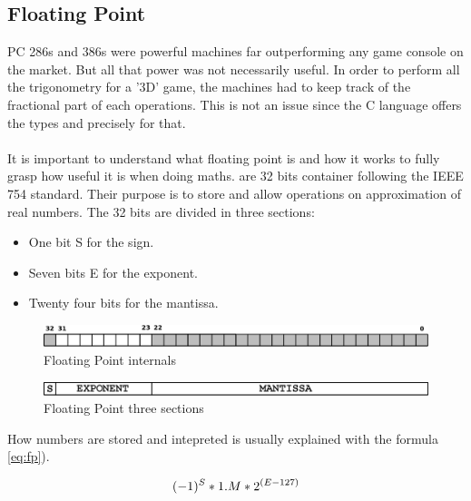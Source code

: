 \documentclass[book.tex]{subfiles}
\begin{document}
  \subsection{Floating Point}
  
   PC 286s and 386s were powerful machines far outperforming any game console on the market. But all that power was not necessarily useful. In order to perform all the trigonometry for a '3D' game, the machines had to keep track of the fractional part of each operations. This is not an issue since the C language offers the types  and  precisely for that.\\
\\
It is important to understand what floating point is and how it works to fully grasp how useful it is when doing maths.  are 32 bits container following the IEEE 754 standard. Their purpose is to store and allow operations on approximation of real numbers. The 32 bits are divided in three sections:\\
\begin{itemize}
  \item One bit S for the sign.
  \item Seven bits E for the exponent.
  \item Twenty four bits for the mantissa.
\end{itemize} 

\begin{figure}[H]
\centering
\includegraphics[scale=0.4]{imgs/floating_point_layout.eps}
\caption{Floating Point internals}
\label{fig:fp_internals}
\end{figure}
  \bigskip



\begin{figure}[H]
\centering
\includegraphics[scale=0.4]{imgs/floating_point_math.eps}
\caption{Floating Point three sections}
\label{fig:fp_regions}
\end{figure}
  \bigskip  


How numbers are stored and intepreted is usually explained with the formula \ref{eq:fp}).\


\begin{equation}\label{eq:fp}
\large
(-1)^S * 1.M * 2^{(E-127)}
\end{equation}
 
\end{document}
